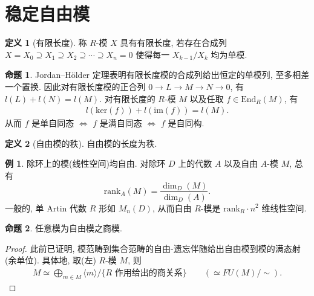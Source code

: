 \documentclass{MainStyle}
\theoremstyle{definition}
\newtheorem{example}{例}
\theoremstyle{definition}
\theoremstyle{definition}
\newtheorem{definition}{定义}
\theoremstyle{definition}
\newtheorem{proposition}{命题}
\theoremstyle{definition}
\theoremstyle{definition}
\theoremstyle{definition}
\theoremstyle{remark}
\theoremstyle{remark}
\begin{document}
\maketitle
\tableofcontents

\section{稳定自由模}
\begin{definition}[有限长度]
    称 $R$-模 $X$ 具有有限长度, 若存在合成列 $X=X_0\supseteq X_1\supseteq X_2\supseteq \cdots \supseteq X_n=0$ 使得每一 $X_{k-1}/X_k$ 均为单模.
\end{definition}

\begin{proposition}
    Jordan–Hölder 定理表明有限长度模的合成列给出恒定的单模列, 至多相差一个置换. 因此对有限长度模的正合列 $0\to L\to M\to N\to 0$, 有 $l(L)+l(N)=l(M)$. 对有限长度的 $R$-模 $M$ 以及任取 $f\in \mathrm{End}_R(M)$, 有
    \begin{align*}
        l(\mathrm{ker}(f))+l(\mathrm{im}(f))=l(M).
    \end{align*}
    从而 $f$ 是单自同态 $\Longleftrightarrow$ $f$ 是满自同态 $\Longleftrightarrow$ $f$ 是自同构.
\end{proposition}

\begin{definition}[自由模的秩]
    自由模的长度为秩.
\end{definition}

\begin{example}
    除环上的模(线性空间)均自由. 对除环 $D$ 上的代数 $A$ 以及自由 $A$-模 $M$, 总有
    \begin{equation*}
        \mathrm{rank}_A(M)=\dfrac{\dim_D(M)}{\dim_D(A)}.
    \end{equation*}
    一般的, 单 Artin 代数 $R$ 形如 $M_n(D)$, 从而自由 $R$-模是 $\mathrm{rank}_R\cdot n^2$ 维线性空间.
\end{example}

\begin{proposition}
    任意模为自由模之商模.
    \begin{proof}
        此前已证明, 模范畴到集合范畴的自由-遗忘伴随给出自由模到模的满态射(余单位). 具体地, 取(左) $R$-模 $M$, 则
        \begin{align*}
            M\simeq \bigoplus_{m\in M} \langle m\rangle \Big/\{R\text{ 作用给出的商关系}\}\qquad (\simeq FU(M)/\sim ).
        \end{align*}
    \end{proof}
\end{proposition}
\end{document}
